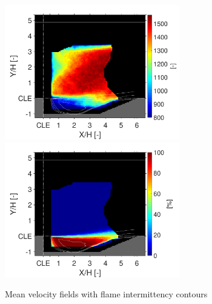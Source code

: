 \begin{figure}
{\includegraphics[width=3in,trim=0.35in 0 0.2in 0, clip]{figures/B1/whole_statistics/B1_sample_size}}
\newline
{\includegraphics[width=3in,trim=0.35in 0 0.42in 0, clip]{figures/B1/cond_statistics/B1_relative_sample_size}}
\caption{Mean velocity fields with flame intermittency contours}\label{fig:ch3_UxAVG_PIVPLIF}
\end{figure}

